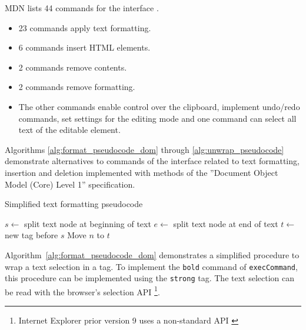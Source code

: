 MDN lists 44 commands for the  interface \cite{bc}. %

\begin{itemize}
\item 23 commands apply text formatting.
\item 6 commands insert HTML elements.
\item 2 commands remove contents.
\item 2 commands remove formatting.
\item The other commands enable control over the clipboard, implement undo/redo commands, set settings for the editing mode and one command can select all text of the editable element.
\end{itemize}

Algorithms \ref{alg:format_pseudocode_dom} through \ref{alg:unwrap_pseudocode} demonstrate alternatives to commands of the  interface related to text formatting, insertion and deletion implemented with methods of the ''Document Object Model (Core) Level 1'' specification.


\begin{algorithm}
\caption{Simplified text formatting pseudocode}
\label{alg:format_pseudocode_dom}
\begin{algorithmic}[1]
\State $s \gets$ split text node at beginning of text
\State $e \gets$ split text node at end of text
\State $t \gets$ new tag before $s$
  \State Move $n$ to $t$
\EndFor
\EndProcedure
\end{algorithmic}
\end{algorithm}



Algorithm~\ref{alg:format_pseudocode_dom} demonstrates a simplified procedure to wrap a text selection in a tag. To implement the \texttt{bold} command of \texttt{execCommand}, this procedure can be implemented using the \texttt{strong} tag. The text selection can be read with the browser's selection API \cite{az}\footnote{Internet Explorer prior version 9 uses a non-standard API \cite{a}}.


